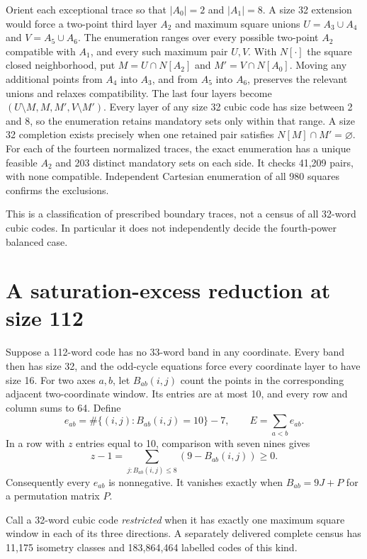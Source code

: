 \documentclass[11pt]{article}
\theoremstyle{definition}
\begin{document}
Orient each exceptional trace so that $|A_0|=2$ and $|A_1|=8$.
A size 32 extension would force a two-point third
layer $A_2$ and maximum square unions $U=A_3\cup A_4$ and
$V=A_5\cup A_6$. The enumeration ranges over every possible two-point $A_2$ compatible
with $A_1$, and every such maximum pair $U,V$. With $N[\cdot]$ the
square closed neighborhood, put
$M=U\cap N[A_2]$ and $M'=V\cap N[A_0]$. Moving any additional points
from $A_4$ into $A_3$, and from $A_5$ into $A_6$, preserves the relevant
unions and relaxes compatibility. The last four layers become
$(U\setminus M,M,M',V\setminus M')$. Every layer of any size 32
cubic code has size between 2 and 8, so the enumeration retains mandatory
sets only within that range. A size 32 completion exists precisely when
one retained pair satisfies $N[M]\cap M'=\varnothing$. For each
of the fourteen normalized traces, the exact enumeration has a unique
feasible $A_2$ and 203 distinct mandatory sets on each side. It checks
41,209 pairs, with none compatible. Independent
Cartesian enumeration of all 980 squares confirms the exclusions.

This is a classification of prescribed boundary traces, not a census of
all 32-word cubic codes. In particular it does not independently decide
the fourth-power balanced case.

\section{A saturation-excess reduction at size 112}
Suppose a 112-word code has no 33-word band in any coordinate. Every band
then has size 32, and the odd-cycle equations force every coordinate
layer to have size 16. For two axes $a,b$, let $B_{ab}(i,j)$ count the
points in the corresponding adjacent two-coordinate window. Its entries
are at most 10, and every row and column sums to 64. Define
\[
 e_{ab}=\#\{(i,j):B_{ab}(i,j)=10\}-7,\qquad
 E=\sum_{a<b}e_{ab}.
\]
In a row with $z$ entries equal to 10, comparison with seven nines gives
\begin{equation}\label{eq:defect}
 z-1=\sum_{j:B_{ab}(i,j)\leq8}(9-B_{ab}(i,j))\geq0.
\end{equation}
Consequently every $e_{ab}$ is nonnegative. It vanishes exactly when
$B_{ab}=9J+P$ for a permutation matrix $P$.

Call a 32-word cubic code \emph{restricted} when it has exactly one
maximum square window in each of its three directions. A separately
delivered complete census has 11,175 isometry classes and 183,864,464
labelled codes of this kind.
\end{document}
